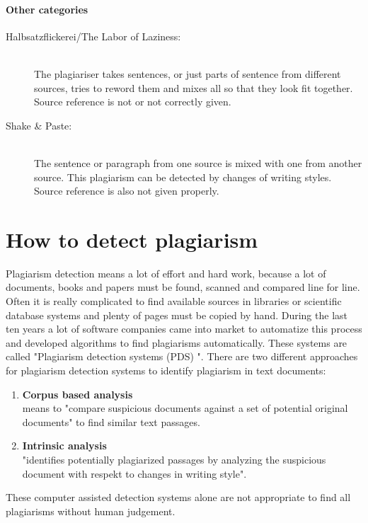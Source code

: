 \paragraph{Other categories}


\begin{description}
\item[Halbsatzflickerei/The Labor of Laziness\citep{PlagiarismSearch}:] \hfill \\
The plagiariser takes sentences, or just parts of sentence from different 
sources, tries to reword them and mixes all so that they look fit together. Source reference is not or not correctly 
given.

\item[Shake \& Paste\citep{one12}:] \hfill \\
The sentence or paragraph from one source is mixed with one from another source. This 
plagiarism can be detected by changes of writing styles. Source reference is also not given properly.
\end{description}

\section{How to detect plagiarism}
Plagiarism detection means a lot of effort and hard work, because a lot of documents, books and papers must be found, scanned and compared line for line. Often it is really complicated to find available sources in libraries or scientific database systems and plenty of pages must be copied by hand. 
During the last ten years a lot of software companies came into market to automatize this process and developed algorithms to find plagiarisms automatically. These systems are called "Plagiarism detection systems (PDS) ". 
There are two different approaches for plagiarism detection systems to identify plagiarism in text documents:
\begin{enumerate}
\item \textbf{Corpus based analysis}\\
means to "compare suspicious documents against a set of potential original documents" \citet{PAN:2007} to find similar text passages.
\item \textbf{Intrinsic analysis}\\
"identifies potentially plagiarized passages by analyzing the suspicious document with respekt to changes in writing style". \citep{PAN:2007}
\end{enumerate}
These computer assisted detection systems alone are not appropriate to find all plagiarisms without human judgement.  

